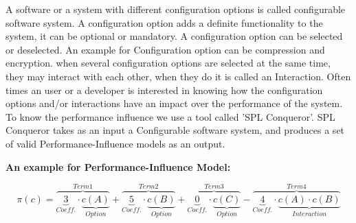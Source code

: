 \label{background}


 
A software or a system with different configuration options is called configurable software system. A configuration option adds a definite functionality to the system, it can be optional or mandatory. A configuration option can be selected or deselected. An example for Configuration option can be compression and encryption.
when several configuration options are selected at the same time, they may interact with each other, when they do it is called an Interaction.
\break
\newline
Often times an user or a developer is interested in knowing how the configuration options and/or interactions have an impact over the performance of the system. To know the performance influence we use a tool called 'SPL Conqueror'.
SPL Conqueror takes as an input a Configurable software system, and produces a set of valid Performance-Influence models as an output.

\textbf{An example for Performance-Influence Model: }

\begin{equation*}
  \pi {(c)} = \overbrace{\underbrace {3}_{Coeff.} \cdot  \underbrace{{c(A)}}_{Option}}^{Term 1}  + \overbrace{ \underbrace{5}_{Coeff.} \cdot \underbrace{{c(B)}}_{Option}}^{Term 2} + \overbrace{\underbrace{0}_{Coeff.} \cdot \underbrace{{c(C)}}_{Option}}^{Term 3} - \overbrace{\underbrace{4}_{Coeff.} \cdot \underbrace{{ c(A)} \cdot {c(B)}}_{Interaction}}^{Term 4}
\end{equation*}



